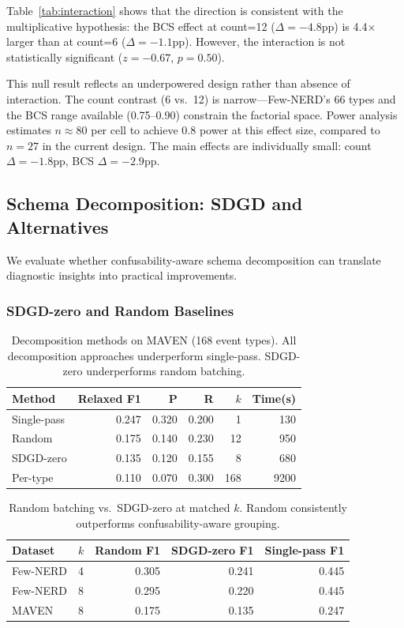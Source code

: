 \documentclass[11pt,a4paper]{article}
\begin{document}
Table~\ref{tab:interaction} shows that the direction is consistent with the multiplicative hypothesis: the BCS effect at count=12 ($\Delta{=}{-}4.8$pp) is 4.4$\times$ larger than at count=6 ($\Delta{=}{-}1.1$pp). However, the interaction is not statistically significant ($z{=}{-}0.67$, $p{=}0.50$).

This null result reflects an underpowered design rather than absence of interaction. The count contrast (6 vs.\ 12) is narrow---Few-NERD's 66 types and the BCS range available (0.75--0.90) constrain the factorial space. Power analysis estimates $n \approx 80$ per cell to achieve 0.8 power at this effect size, compared to $n{=}27$ in the current design. The main effects are individually small: count $\Delta{=}{-}1.8$pp, BCS $\Delta{=}{-}2.9$pp.

\subsection{Schema Decomposition: SDGD and Alternatives}
\label{sec:sdgd}

We evaluate whether confusability-aware schema decomposition can translate diagnostic insights into practical improvements.

\subsubsection{SDGD-zero and Random Baselines}

\begin{table}[t]
\centering
\caption{Decomposition methods on MAVEN (168 event types). All decomposition approaches underperform single-pass. SDGD-zero underperforms random batching.}
\label{tab:sdgd-maven}
\begin{tabular}{lrrrrr}
\toprule
Method & Relaxed F1 & P & R & $k$ & Time(s) \\
\midrule
Single-pass & 0.247 & 0.320 & 0.200 & 1   & 130  \\
Random      & 0.175 & 0.140 & 0.230 & 12  & 950  \\
SDGD-zero   & 0.135 & 0.120 & 0.155 & 8   & 680  \\
Per-type    & 0.110 & 0.070 & 0.300 & 168 & 9200 \\
\bottomrule
\end{tabular}
\end{table}

\begin{table}[t]
\centering
\caption{Random batching vs.\ SDGD-zero at matched $k$. Random consistently outperforms confusability-aware grouping.}
\label{tab:random-ablation}
\begin{tabular}{llrrr}
\toprule
Dataset & $k$ & Random F1 & SDGD-zero F1 & Single-pass F1 \\
\midrule
Few-NERD & 4 & 0.305 & 0.241 & 0.445 \\
Few-NERD & 8 & 0.295 & 0.220 & 0.445 \\
MAVEN    & 8 & 0.175 & 0.135 & 0.247 \\
\bottomrule
\end{tabular}
\end{table}
\end{document}

